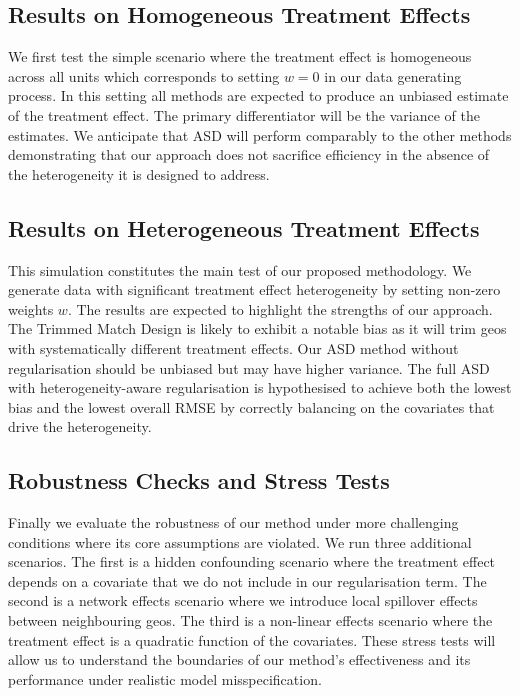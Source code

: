 \documentclass[final,3p,fleqn, 10pt]{elsarticle}
\begin{document}
    \subsection{Results on Homogeneous Treatment Effects}
    We first test the simple scenario where the treatment effect is homogeneous across all units which corresponds to setting $w=0$ in our data generating process. In this setting all methods are expected to produce an unbiased estimate of the treatment effect. The primary differentiator will be the variance of the estimates. We anticipate that ASD will perform comparably to the other methods demonstrating that our approach does not sacrifice efficiency in the absence of the heterogeneity it is designed to address.

    \subsection{Results on Heterogeneous Treatment Effects}
    This simulation constitutes the main test of our proposed methodology. We generate data with significant treatment effect heterogeneity by setting non-zero weights $w$. The results are expected to highlight the strengths of our approach. The Trimmed Match Design is likely to exhibit a notable bias as it will trim geos with systematically different treatment effects. Our ASD method without regularisation should be unbiased but may have higher variance. The full ASD with heterogeneity-aware regularisation is hypothesised to achieve both the lowest bias and the lowest overall RMSE by correctly balancing on the covariates that drive the heterogeneity.

    \subsection{Robustness Checks and Stress Tests}
    Finally we evaluate the robustness of our method under more challenging conditions where its core assumptions are violated. We run three additional scenarios. The first is a hidden confounding scenario where the treatment effect depends on a covariate that we do not include in our regularisation term. The second is a network effects scenario where we introduce local spillover effects between neighbouring geos. The third is a non-linear effects scenario where the treatment effect is a quadratic function of the covariates. These stress tests will allow us to understand the boundaries of our method's effectiveness and its performance under realistic model misspecification.
\end{document}
